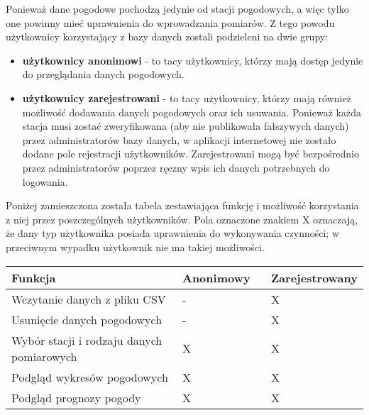 Ponieważ dane pogodowe pochodzą jedynie od stacji pogodowych, a więc tylko one powinny mieć uprawnienia do wprowadzania pomiarów. Z tego powodu użytkownicy korzystający z bazy danych zostali podzieleni na dwie grupy:
\begin{itemize}
	\item \textbf{użytkownicy anonimowi} - to tacy użytkownicy, którzy mają dostęp jedynie do przeglądania danych pogodowych.
	\item \textbf{użytkownicy zarejestrowani} - to tacy użytkownicy, którzy mają również możliwość dodawania danych pogodowych oraz ich usuwania. Ponieważ każda stacja musi zostać zweryfikowana (aby nie publikowała fałszywych danych) przez administratorów bazy danych, w aplikacji internetowej nie zostało dodane pole rejestracji użytkowników. Zarejestrowani mogą być bezpośrednio przez administratorów poprzez ręczny wpis ich danych potrzebnych do logowania.  
\end{itemize}
Poniżej zamieszczona została tabela zestawiająca funkcję i możliwość korzystania z niej przez poszczególnych użytkowników. Pola oznaczone znakiem X oznaczają, że dany typ użytkownika posiada uprawnienia do wykonywania czynności; w przeciwnym wypadku użytkownik nie ma takiej możliwości.

\begin{longtable}{|p{0.5\linewidth}|p{0.25\linewidth}||p{0.25\linewidth}|}
\hline
\textbf{Funkcja} & \textbf{Anonimowy} & \textbf{Zarejestrowany} \tabularnewline \hline \hline
Wczytanie danych z pliku CSV & - & X \tabularnewline\hline
Usunięcie danych pogodowych & - & X \tabularnewline\hline
Wybór stacji i rodzaju danych pomiarowych & X & X \tabularnewline\hline
Podgląd wykresów pogodowych & X & X \tabularnewline\hline
Podgląd prognozy pogody & X & X \tabularnewline\hline
\end{longtable}
